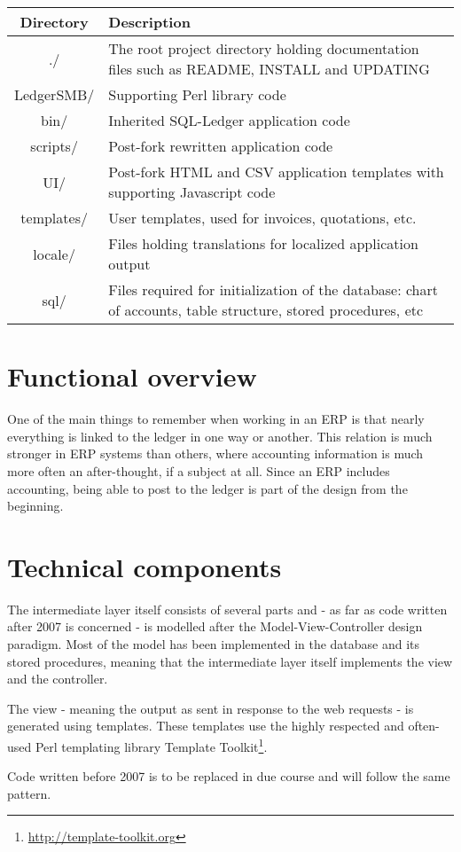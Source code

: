 \begin{tabular}{|c|p{9cm}|}
\hline Directory &  Description \\
\hline
./ & The root project directory holding documentation files such as
  README, INSTALL and UPDATING  \\ 
LedgerSMB/ & Supporting Perl library code \\
bin/ & Inherited SQL-Ledger application code \\
scripts/ & Post-fork rewritten application code \\
UI/ & Post-fork HTML and CSV application templates with supporting Javascript code \\
templates/ & User templates, used for invoices, quotations, etc. \\
locale/ & Files holding translations for localized application output \\
sql/ & Files required for initialization of the database: chart of accounts,
 table structure, stored procedures, etc \\
\hline 
\end{tabular} 


\section{Functional overview}

One of the main things to remember when working in an ERP is that nearly everything is
linked to the ledger in one way or another.  This relation is much stronger in ERP
systems than others, where accounting information is much more often an after-thought,
if a subject at all.  Since an ERP includes accounting, being able to post to the
ledger is part of the design from the beginning.





\section{Technical components}

The intermediate layer itself consists of several parts and - as far as code written
after 2007 is concerned - is modelled after the Model-View-Controller design paradigm.
Most of the model has been implemented in the database and its stored procedures, meaning
that the intermediate layer itself implements the view and the controller.

The view - meaning the output as sent in response to the web requests - is generated
using templates.  These templates use the highly respected and often-used Perl templating
library Template Toolkit\footnote{\url{http://template-toolkit.org}}.

Code written before 2007 is to be replaced in due course and will follow the same
pattern.


